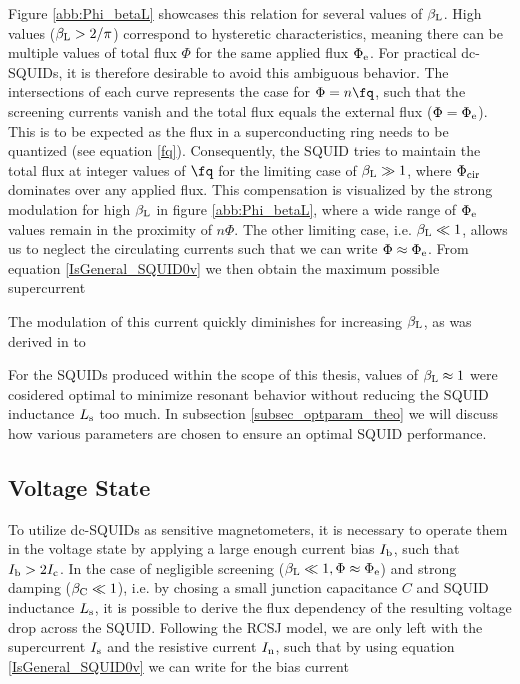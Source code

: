 Figure \ref{abb:Phi_betaL} showcases this relation for several values of $\beta_{\rm L}$. High values ($\beta_{\rm L}>2/\pi$) correspond to  hysteretic characteristics, meaning there can be multiple values of total flux $\Phi$ for the same applied flux $\Phi_{\rm e}$. For practical dc-SQUIDs, it is therefore desirable to avoid this ambiguous behavior. The intersections of each curve represents the case for $\Phi = n\unit{\fq}$, such that the screening currents vanish and the total flux equals the external flux ($\Phi=\Phi_{\rm e}$). This is to be expected as the flux in a superconducting ring needs to be quantized (see equation \ref{fq}). Consequently, the SQUID tries to maintain the total flux at integer values of $\unit{\fq}$ for the limiting case of $\beta_{\rm L}\gg 1$, where $\Phi_{\rm cir}$ dominates over any applied flux. This compensation is visualized by the strong modulation for high $\beta_{\rm L}$ in figure \ref{abb:Phi_betaL}, where a wide range of $\Phi_{\rm e}$ values remain in the proximity of $n\Phi$. The other limiting case, i.e. $\beta_{\rm L}\ll 1$, allows us to neglect the circulating currents such that we can write $\Phi \approx \Phi_{\rm e}$. From equation \ref{IsGeneral_SQUID0v} we then obtain the maximum possible supercurrent 


The modulation of this current quickly diminishes for increasing $\beta_{\rm L}$, as was derived in \cite{Clarke2004} to 


For the SQUIDs produced within the scope of this thesis, values of $\beta_{\rm L}\approx 1$ were cosidered optimal to minimize resonant behavior without reducing the SQUID inductance $L_{\rm s}$ too much. In subsection \ref{subsec_optparam_theo} we will discuss how various parameters are chosen to ensure an optimal SQUID performance.

\subsection{Voltage State} \label{sec_voltagestate}

To utilize dc-SQUIDs as sensitive magnetometers, it is necessary to operate them in the voltage state by applying a large enough current bias $I_{\rm b}$, such that $I_{\rm b}>2I_{\rm c}$. In the case of negligible screening ($\beta_{\rm L}\ll 1, \Phi\approx\Phi_{\rm e}$) and strong damping ($\beta_{\rm C}\ll 1$), i.e. by chosing a small junction capacitance $C$ and SQUID inductance $L_{\rm s}$, it is possible to derive the flux dependency of the resulting voltage drop across the SQUID. Following the RCSJ model, we are only left with the supercurrent $I_{\rm s}$ and the resistive current $I_{\rm n}$, such that by using equation \ref{IsGeneral_SQUID0v} we can write for the bias current 

